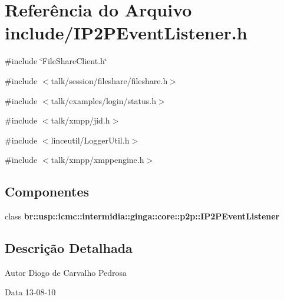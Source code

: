 \section{Referência do Arquivo include/IP2PEventListener.h}
\label{IP2PEventListener_8h}
{\ttfamily \#include \char`\"{}FileShareClient.h\char`\"{}}\par
{\ttfamily \#include $<$talk/session/fileshare/fileshare.h$>$}\par
{\ttfamily \#include $<$talk/examples/login/status.h$>$}\par
{\ttfamily \#include $<$talk/xmpp/jid.h$>$}\par
{\ttfamily \#include $<$linceutil/LoggerUtil.h$>$}\par
{\ttfamily \#include $<$talk/xmpp/xmppengine.h$>$}\par
\subsection*{Componentes}
\begin{DoxyCompactItemize}
\item 
class {\bf br::usp::icmc::intermidia::ginga::core::p2p::IP2PEventListener}
\end{DoxyCompactItemize}


\subsection{Descrição Detalhada}
\begin{DoxyAuthor}{Autor}
Diogo de Carvalho Pedrosa 
\end{DoxyAuthor}
\begin{DoxyDate}{Data}
13-\/08-\/10 
\end{DoxyDate}

